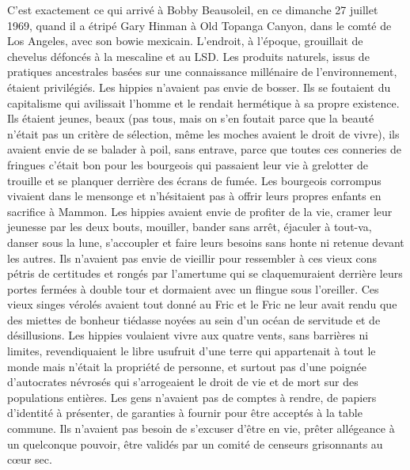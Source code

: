 C’est exactement ce qui arrivé à Bobby Beausoleil, en ce dimanche 27 juillet 1969, quand il a étripé Gary Hinman à Old Topanga Canyon, dans le comté de Los Angeles, avec son bowie mexicain. L’endroit, à l’époque, grouillait de chevelus défoncés à la mescaline et au LSD. Les produits naturels, issus de pratiques ancestrales basées sur une connaissance millénaire de l’environnement, étaient privilégiés. Les hippies n’avaient pas envie de bosser. Ils se foutaient du capitalisme qui avilissait l’homme et le rendait hermétique à sa propre existence. Ils étaient jeunes, beaux (pas tous, mais on s’en foutait parce que la beauté n’était pas un critère de sélection, même les moches avaient le droit de vivre), ils avaient envie de se balader à poil, sans entrave, parce que toutes ces conneries de fringues c’était bon pour les bourgeois qui passaient leur vie à grelotter de trouille et se planquer derrière des écrans de fumée. Les bourgeois corrompus vivaient dans le mensonge et n’hésitaient pas à offrir leurs propres enfants en sacrifice à Mammon. Les hippies avaient envie de profiter de la vie, cramer leur jeunesse par les deux bouts, mouiller, bander sans arrêt, éjaculer à tout-va, danser sous la lune, s’accoupler et faire leurs besoins sans honte ni retenue devant les autres. Ils n’avaient pas envie de vieillir pour ressembler à ces vieux cons pétris de certitudes et rongés par l’amertume qui se claquemuraient derrière leurs portes fermées à double tour et dormaient avec un flingue sous l’oreiller. Ces vieux singes vérolés avaient tout donné au Fric et le Fric ne leur avait rendu que des miettes de bonheur tiédasse noyées au sein d’un océan de servitude et de désillusions. Les hippies voulaient vivre aux quatre vents, sans barrières ni limites, revendiquaient le libre usufruit d’une terre qui appartenait à tout le monde mais n’était la propriété de personne, et surtout pas d’une poignée d’autocrates névrosés qui s’arrogeaient le droit de vie et de mort sur des populations entières. Les gens n’avaient pas de comptes à rendre, de papiers d’identité à présenter, de garanties à fournir pour être acceptés à la table commune. Ils n’avaient pas besoin de s’excuser d’être en vie, prêter allégeance à un quelconque pouvoir, être validés par un comité de censeurs grisonnants au cœur sec.


